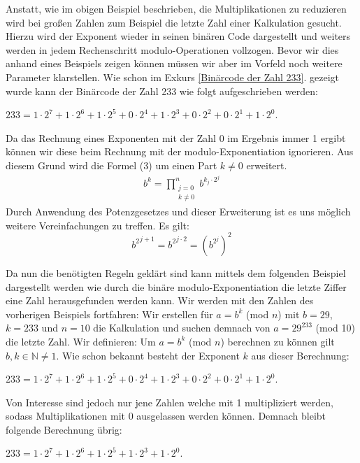 \documentclass[12pt,a4paper]{article}
\theoremstyle{definition}
\begin{document}
Anstatt, wie im obigen Beispiel beschrieben, die Multiplikationen zu reduzieren wird bei großen Zahlen zum Beispiel die letzte Zahl einer Kalkulation gesucht.
Hierzu wird der Exponent wieder in seinen binären Code dargestellt und weiters werden in jedem Rechenschritt modulo-Operationen vollzogen.\newline
Bevor wir dies anhand eines Beispiels zeigen können müssen wir aber im Vorfeld noch weitere Parameter klarstellen. Wie schon im Exkurs \ref{Binärcode der Zahl 233}. gezeigt wurde kann der Binärcode der Zahl 233 wie folgt aufgeschrieben werden:
\begin{center}
$233 = 1 \cdot 2^7 + 1 \cdot 2^6 + 1 \cdot2^5 + 0 \cdot2^4 + 1 \cdot 2^3 + 0 \cdot2^2 + 0 \cdot 2^1 + 1 \cdot 2^0$.
\end{center}
Da das Rechnung eines Exponenten mit der Zahl 0 im Ergebnis immer 1 ergibt können wir diese beim Rechnung mit der modulo-Exponentiation ignorieren. Aus diesem Grund wird die Formel (3) um einen Part $k \neq 0$ erweitert.
\begin{align}
b^k = \prod_{\substack{j=0\\k\neq0}}^n b^{k_j \cdot 2^j}
\end{align}
Durch Anwendung des Potenzgesetzes und dieser Erweiterung ist es uns möglich weitere Vereinfachungen zu treffen. Es gilt:
\[{b^2}^{j+1} = {b^2}^{j \cdot 2} = (b^{2^j})^2\]


Da nun die benötigten Regeln geklärt sind kann mittels dem folgenden Beispiel dargestellt werden wie durch die binäre modulo-Exponentiation die letzte Ziffer eine Zahl herausgefunden werden kann.
Wir werden mit den Zahlen des vorherigen Beispiels fortfahren:
\newline
Wir erstellen für $a = b^k$ (mod $n$) mit $b = 29$, $k = 233$ und $n = 10$ die Kalkulation und suchen demnach von $a = 29^{233}$ (mod 10) die letzte Zahl.\newline
Wir definieren: Um $a = b^k$ (mod $n$) berechnen zu können gilt $b, k \in \mathbb{N} \neq 1$.
Wie schon bekannt besteht der Exponent $k$ aus dieser Berechnung:
\begin{center}
$233 = 1 \cdot 2^7 + 1 \cdot 2^6 + 1 \cdot2^5 + 0 \cdot2^4 + 1 \cdot 2^3 + 0 \cdot2^2 + 0 \cdot 2^1 + 1 \cdot 2^0$.
\end{center}

Von Interesse sind jedoch nur jene Zahlen welche mit 1 multipliziert werden, sodass Multiplikationen mit 0 ausgelassen werden können.
Demnach bleibt folgende Berechnung übrig:
\begin{center}
$233 = 1 \cdot 2^7 + 1 \cdot 2^6 + 1 \cdot2^5 + 1 \cdot 2^3 + 1 \cdot 2^0$.
\end{center}
\end{document}
